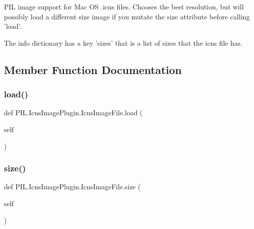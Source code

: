 \begin{DoxyVerb}PIL image support for Mac OS .icns files.
Chooses the best resolution, but will possibly load
a different size image if you mutate the size attribute
before calling 'load'.

The info dictionary has a key 'sizes' that is a list
of sizes that the icns file has.
\end{DoxyVerb}
 

\subsection{Member Function Documentation}
\mbox{\label{classPIL_1_1IcnsImagePlugin_1_1IcnsImageFile_ab1c0f090bd473156953fb55884a9046d}} 
\subsubsection{\texorpdfstring{load()}{load()}}
{\footnotesize\ttfamily def P\+I\+L.\+Icns\+Image\+Plugin.\+Icns\+Image\+File.\+load (\begin{DoxyParamCaption}\item[{}]{self }\end{DoxyParamCaption})}

\mbox{\label{classPIL_1_1IcnsImagePlugin_1_1IcnsImageFile_a9d77c3cef482ce715044d23cb56d9649}} 
\subsubsection{\texorpdfstring{size()}{size()}\hspace{0.1cm}{\footnotesize\ttfamily [1/2]}}
{\footnotesize\ttfamily def P\+I\+L.\+Icns\+Image\+Plugin.\+Icns\+Image\+File.\+size (\begin{DoxyParamCaption}\item[{}]{self }\end{DoxyParamCaption})}

